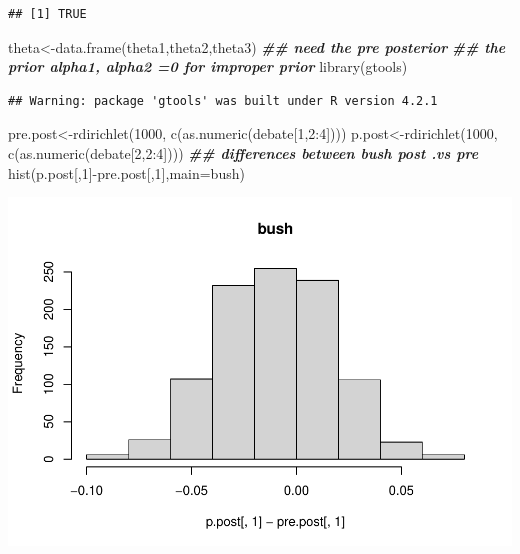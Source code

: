 \documentclass[
]{book}
\newenvironment{Shaded}{\begin{snugshade}}{\end{snugshade}}
\newcommand{\AttributeTok}[1]{\textcolor[rgb]{0.77,0.63,0.00}{#1}}
\newcommand{\DecValTok}[1]{\textcolor[rgb]{0.00,0.00,0.81}{#1}}
\newcommand{\DocumentationTok}[1]{\textcolor[rgb]{0.56,0.35,0.01}{\textbf{\textit{#1}}}}
\newcommand{\FunctionTok}[1]{\textcolor[rgb]{0.00,0.00,0.00}{#1}}
\newcommand{\NormalTok}[1]{#1}
\newcommand{\OtherTok}[1]{\textcolor[rgb]{0.56,0.35,0.01}{#1}}
\newcommand{\SpecialCharTok}[1]{\textcolor[rgb]{0.00,0.00,0.00}{#1}}
\newcommand{\StringTok}[1]{\textcolor[rgb]{0.31,0.60,0.02}{#1}}
\theoremstyle{definition}
\theoremstyle{definition}
\theoremstyle{definition}
\theoremstyle{definition}
\theoremstyle{remark}
\begin{document}
\begin{verbatim}
## [1] TRUE
\end{verbatim}

\begin{Shaded}
\begin{Highlighting}[]
\NormalTok{ theta}\OtherTok{\textless{}{-}}\FunctionTok{data.frame}\NormalTok{(theta1,theta2,theta3)}
 \DocumentationTok{\#\# need the pre posterior}
 \DocumentationTok{\#\# the prior alpha1, alpha2 =0 for improper prior}
 \FunctionTok{library}\NormalTok{(gtools)}
\end{Highlighting}
\end{Shaded}

\begin{verbatim}
## Warning: package 'gtools' was built under R version 4.2.1
\end{verbatim}

\begin{Shaded}
\begin{Highlighting}[]
\NormalTok{  pre.post}\OtherTok{\textless{}{-}}\FunctionTok{rdirichlet}\NormalTok{(}\DecValTok{1000}\NormalTok{, }\FunctionTok{c}\NormalTok{(}\FunctionTok{as.numeric}\NormalTok{(debate[}\DecValTok{1}\NormalTok{,}\DecValTok{2}\SpecialCharTok{:}\DecValTok{4}\NormalTok{])))}
\NormalTok{   p.post}\OtherTok{\textless{}{-}}\FunctionTok{rdirichlet}\NormalTok{(}\DecValTok{1000}\NormalTok{, }\FunctionTok{c}\NormalTok{(}\FunctionTok{as.numeric}\NormalTok{(debate[}\DecValTok{2}\NormalTok{,}\DecValTok{2}\SpecialCharTok{:}\DecValTok{4}\NormalTok{])))}
  \DocumentationTok{\#\# differences between bush post .vs pre}
   \FunctionTok{hist}\NormalTok{(p.post[,}\DecValTok{1}\NormalTok{]}\SpecialCharTok{{-}}\NormalTok{pre.post[,}\DecValTok{1}\NormalTok{],}\AttributeTok{main=}\StringTok{\textquotesingle{}bush\textquotesingle{}}\NormalTok{)}
\end{Highlighting}
\end{Shaded}

\includegraphics{_main_files/figure-latex/unnamed-chunk-30-1.pdf}
\end{document}
